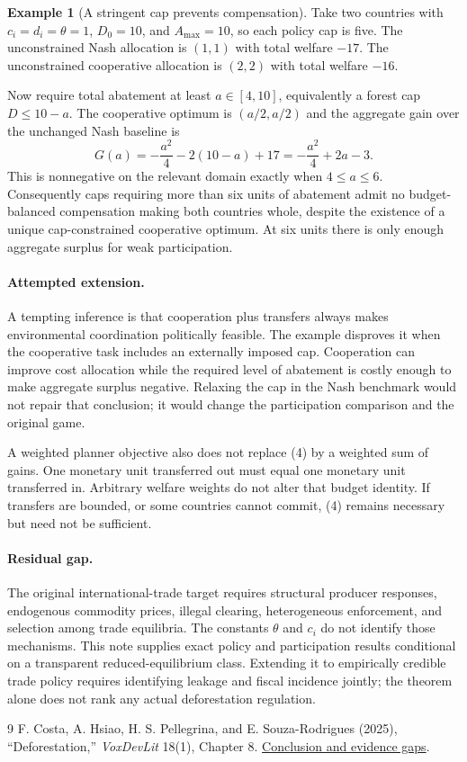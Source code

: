 \documentclass[11pt]{article}
\theoremstyle{definition}
\newtheorem{example}[theorem]{Example}
\begin{document}
\begin{example}[A stringent cap prevents compensation]
Take two countries with $c_i=d_i=\theta=1$, $D_0=10$, and $A_{\max}=10$, so each policy cap is five. The unconstrained Nash allocation is $(1,1)$ with total welfare $-17$. The unconstrained cooperative allocation is $(2,2)$ with total welfare $-16$.

Now require total abatement at least $a\in[4,10]$, equivalently a forest cap $D\leq10-a$. The cooperative optimum is $(a/2,a/2)$ and the aggregate gain over the unchanged Nash baseline is
\[
 G(a)=-\frac{a^2}{4}-2(10-a)+17
     =-\frac{a^2}{4}+2a-3.
\]
This is nonnegative on the relevant domain exactly when $4\leq a\leq6$. Consequently caps requiring more than six units of abatement admit no budget-balanced compensation making both countries whole, despite the existence of a unique cap-constrained cooperative optimum. At six units there is only enough aggregate surplus for weak participation.
\end{example}

\paragraph{Attempted extension.}
A tempting inference is that cooperation plus transfers always makes environmental coordination politically feasible. The example disproves it when the cooperative task includes an externally imposed cap. Cooperation can improve cost allocation while the required level of abatement is costly enough to make aggregate surplus negative. Relaxing the cap in the Nash benchmark would not repair that conclusion; it would change the participation comparison and the original game.

A weighted planner objective also does not replace (4) by a weighted sum of gains. One monetary unit transferred out must equal one monetary unit transferred in. Arbitrary welfare weights do not alter that budget identity. If transfers are bounded, or some countries cannot commit, (4) remains necessary but need not be sufficient.

\paragraph{Residual gap.}
The original international-trade target requires structural producer responses, endogenous commodity prices, illegal clearing, heterogeneous enforcement, and selection among trade equilibria. The constants $\theta$ and $c_i$ do not identify those mechanisms. This note supplies exact policy and participation results conditional on a transparent reduced-equilibrium class. Extending it to empirically credible trade policy requires identifying leakage and fiscal incidence jointly; the theorem alone does not rank any actual deforestation regulation.

\begin{thebibliography}{9}
 F. Costa, A. Hsiao, H. S. Pellegrina, and E. Souza-Rodrigues (2025), ``Deforestation,'' \emph{VoxDevLit} 18(1), Chapter 8. \href{https://www.voxdev.org/voxdevlit/deforestation/conclusion-and-evidence-gaps}{Conclusion and evidence gaps}.
\end{thebibliography}
\end{document}
